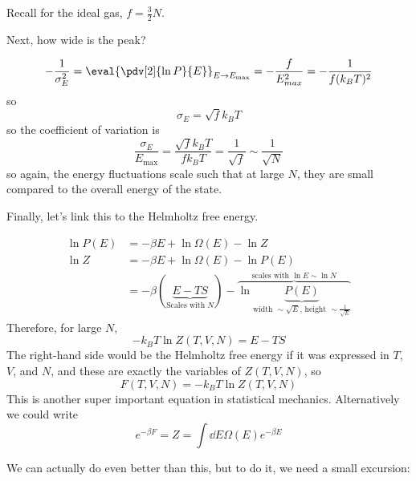 \documentclass[a4paper,twoside,master.tex]{subfiles}
\begin{document}
Recall for the ideal gas, $ f = \frac{3}{2} N $.

Next, how wide is the peak?

\begin{equation}
    - \frac{1}{\sigma^2_E} = \eval{\pdv[2]{\ln P}{E}}_{E \to E_{\text{max}}} = - \frac{f}{E_{max}^2} = - \frac{1}{f(k_B T)^2}
\end{equation}
so
\begin{equation}
    \sigma_E = \sqrt{f} k_B T
\end{equation}
so the coefficient of variation is
\begin{equation}
    \frac{\sigma_E}{E_{\text{max}}} = \frac{\sqrt{f} k_B T}{f k_B T} = \frac{1}{\sqrt{f}} \sim \frac{1}{\sqrt{N}}
\end{equation}
so again, the energy fluctuations scale such that at large $ N $, they are small compared to the overall energy of the state.


Finally, let's link this to the Helmholtz free energy.

\begin{align}
    \ln P(E) &= - \beta E + \ln \Omega(E) - \ln Z \\
    \ln Z &= - \beta E + \ln \Omega(E) - \ln P(E) \\
    &= - \beta(\underbrace{E - TS}_{\text{Scales with } N}) - \overbrace{\ln \underbrace{P(E)}_{\text{width } \sim \sqrt{E} \text{, height } \sim \frac{1}{\sqrt{E}}}}^{\text{scales with } \ln{E} \sim \ln{N}}
\end{align}
Therefore, for large $ N $,
\begin{equation}
    - k_B T \ln Z(T,V,N) = E - TS
\end{equation}
The right-hand side would be the Helmholtz free energy if it was expressed in $ T $, $ V $, and $ N $, and these are exactly the variables of $ Z(T,V,N) $, so
\begin{equation}
    F(T,V,N) = - k_B T \ln Z(T,V,N)
\end{equation}
This is another super important equation in statistical mechanics. Alternatively we could write
\begin{equation}
    e^{- \beta F} = Z = \int \dd{E} \Omega(E) e^{- \beta E}
\end{equation}

We can actually do even better than this, but to do it, we need a small excursion:
\end{document}

